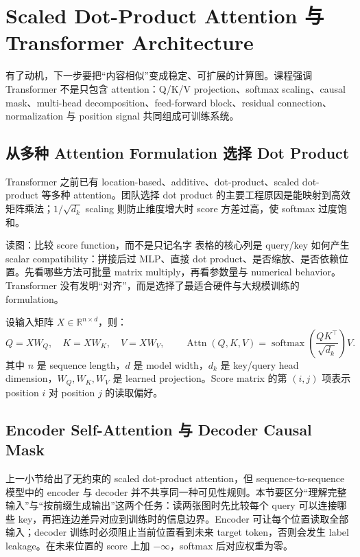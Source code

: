 \section{Scaled Dot-Product Attention 与 Transformer Architecture}

有了动机，下一步要把“内容相似”变成稳定、可扩展的计算图。课程强调 Transformer 不是只包含 attention：Q/K/V projection、softmax scaling、causal mask、multi-head decomposition、feed-forward block、residual connection、normalization 与 position signal 共同组成可训练系统。

\subsection{从多种 Attention Formulation 选择 Dot Product}

Transformer 之前已有 location-based、additive、dot-product、scaled dot-product 等多种 attention。团队选择 dot product 的主要工程原因是能映射到高效矩阵乘法；$1/\sqrt{d_k}$ scaling 则防止维度增大时 score 方差过高，使 softmax 过度饱和。


\begin{knowledgebox}{读图：比较 score function，而不是只记名字}
表格的核心列是 query/key 如何产生 scalar compatibility：拼接后过 MLP、直接 dot product、是否缩放、是否依赖位置。先看哪些方法可批量 matrix multiply，再看参数量与 numerical behavior。Transformer 没有发明“对齐”，而是选择了最适合硬件与大规模训练的 formulation。
\end{knowledgebox}

设输入矩阵 $X\in\mathbb{R}^{n\times d}$，则：
\[
Q=XW_Q,\quad K=XW_K,\quad V=XW_V,\qquad
\operatorname{Attn}(Q,K,V)=\operatorname{softmax}\!\left(\frac{QK^\top}{\sqrt{d_k}}\right)V.
\]
其中 $n$ 是 sequence length，$d$ 是 model width，$d_k$ 是 key/query head dimension，$W_Q,W_K,W_V$ 是 learned projection。Score matrix 的第 $(i,j)$ 项表示 position $i$ 对 position $j$ 的读取偏好。

\subsection{Encoder Self-Attention 与 Decoder Causal Mask}

上一小节给出了无约束的 scaled dot-product attention，但 sequence-to-sequence 模型中的 encoder 与 decoder 并不共享同一种可见性规则。本节要区分“理解完整输入”与“按前缀生成输出”这两个任务：读两张图时先比较每个 query 可以连接哪些 key，再把连边差异对应到训练时的信息边界。Encoder 可让每个位置读取全部输入；decoder 训练时必须阻止当前位置看到未来 target token，否则会发生 label leakage。在未来位置的 score 上加 $-\infty$，softmax 后对应权重为零。

